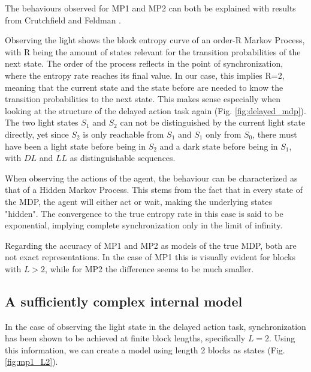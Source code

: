 \documentclass[12pt,a4paper]{article}
\begin{document}
The behaviours observed for MP1 and MP2 can both be explained with results from Crutchfield and Feldman \autocite{crutchfield2003regularities}.

Observing the light shows the block entropy curve of an order-R Markov Process, with R being the amount of states relevant for the transition probabilities of the next state.
The order of the process reflects in the point of synchronization, where the entropy rate reaches its final value.
In our case, this implies R=2, meaning that the current state and the state before are needed to know the transition probabilities to the next state.
This makes sense especially when looking at the structure of the delayed action task again (Fig. \ref{fig:delayed_mdp}).
The two light states $S_1$ and $S_2$ can not be distinguished by the current light state directly, yet since $S_2$ is only reachable from $S_1$ and $S_1$ only from $S_0$, there must have been a light state before being in $S_2$ and a dark state before being in $S_1$, with $DL$ and $LL$ as distinguishable sequences.

When observing the actions of the agent, the behaviour can be characterized as that of a Hidden Markov Process.
This stems from the fact that in every state of the MDP, the agent will either act or wait, making the underlying states "hidden".
The convergence to the true entropy rate in this case is said to be exponential, implying complete synchronization only in the limit of infinity.

Regarding the accuracy of MP1 and MP2 as models of the true MDP, both are not exact representations.
In the case of MP1 this is visually evident for blocks with $L > 2$, while for MP2 the difference seems to be much smaller.

\subsection{A sufficiently complex internal model} \label{ssec:sufficient_internal_model}
In the case of observing the light state in the delayed action task, synchronization has been shown to be achieved at finite block lengths, specifically $L=2$.
Using this information, we can create a model using length 2 blocks as states (Fig. \ref{fig:mp1_L2}).
\end{document}
